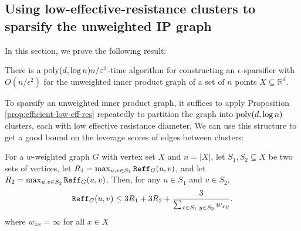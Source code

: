 \subsection{Using low-effective-resistance clusters to sparsify the unweighted IP graph}

In this section, we prove the following result:

\begin{proposition}\label{prop:unweighted-ip-sparsify}
There is a $\mathrm{poly}(d,\log n) n/\varepsilon^2$-time algorithm for constructing an $\epsilon$-sparsifier with $O(n/\epsilon^2)$ for the unweighted inner product graph of a set of $n$ points $X\subseteq \mathbb{R}^d$.
\end{proposition}

To sparsify an unweighted inner product graph, it suffices to apply Proposition \ref{prop:efficient-low-eff-res} repeatedly to partition the graph into $\mathrm{poly}(d,\log n)$ clusters, each with low effective resistance diameter. We can use this structure to get a good bound on the leverage scores of edges between clusters:

\begin{proposition}\label{prop:lev-score-bound}
For a $w$-weighted graph $G$ with vertex set $X$ and $n = |X|$, let $S_1,S_2\subseteq X$ be two sets of vertices, let $R_1 = \max_{u,v\in S_1} \mathtt{Reff}_G(u,v)$, and let $R_2 = \max_{u,v\in S_2} \mathtt{Reff}_G(u,v)$. Then, for any $u\in S_1$ and $v\in S_2$,
\begin{align*}
\mathtt{Reff}_G(u,v)\le 3R_1 + 3R_2 + \frac{3}{\sum_{x\in S_1,y\in S_2} w_{xy}} .
\end{align*}
where $w_{xx} = \infty$ for all $x\in X$
\end{proposition}

